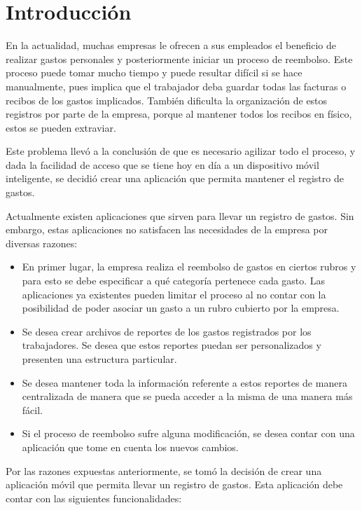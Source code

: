 \chapter*{Introducción} \label{sec:Introduccion}

\vspace{5 mm}

En la actualidad, muchas empresas le ofrecen a sus empleados el beneficio de realizar gastos personales y posteriormente iniciar un proceso de reembolso. Este proceso puede tomar mucho tiempo y puede resultar difícil si se hace manualmente, pues implica que el trabajador deba guardar todas las facturas o recibos de los gastos implicados. También dificulta la organización de estos registros por parte de la empresa, porque al mantener todos los recibos en físico, estos se pueden extraviar.

Este problema llevó a la conclusión de que es necesario agilizar todo el proceso, y dada la facilidad de acceso que se tiene hoy en día a un dispositivo móvil inteligente, se decidió crear una aplicación que permita mantener el registro de gastos. 

Actualmente existen aplicaciones que sirven para llevar un registro de gastos. Sin embargo, estas aplicaciones no satisfacen las necesidades de la empresa por diversas razones:

\begin{itemize}
\item En primer lugar, la empresa realiza el reembolso de gastos en ciertos rubros y para esto se debe especificar a qué categoría pertenece cada gasto. Las aplicaciones ya existentes pueden limitar el proceso al no contar con la posibilidad de poder asociar un gasto a un rubro cubierto por la empresa.
\item Se desea crear archivos de reportes de los gastos registrados por los trabajadores. Se desea que estos reportes puedan ser personalizados y presenten una estructura particular.
\item Se desea mantener toda la información referente a estos reportes de manera centralizada de manera que se pueda acceder a la misma de una manera más fácil.
\item Si el proceso de reembolso sufre alguna modificación, se desea contar con una aplicación que tome en cuenta los nuevos cambios.
\end{itemize}

Por las razones expuestas anteriormente, se tomó la decisión de crear una aplicación móvil que permita llevar un registro de gastos. Esta aplicación debe contar con las siguientes funcionalidades:

